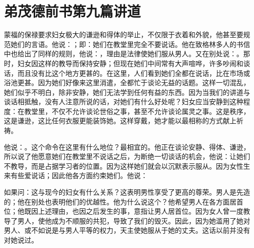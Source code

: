 
\section{弟茂德前书第九篇讲道}

\par

\par

蒙福的保禄要求妇女极大的谦逊和得体的举止，不仅限于衣着和外貌，他甚至要规范她们的言语。他说：；即：她们在教堂里完全不要说话。他在致格林多人的书信中也给出了同样的规则，他说：，理由是法律使她们服从男人。又在别处说：。那时，妇女因这样的教导而保持安静；但现在她们中间常有大声喧哗，许多吵闹和谈话，而且没有比这个地方更甚的。在这里，人们看到她们全都在说话，比在市场或浴池更甚。因为她们好像来这里消遣，全都忙于谈论无益的话题。这样一切混乱，她们似乎不明白，除非安静，她们无法学到任何有益的东西。因为当我们的讲道与谈话相抵触，没有人注意所说的话，对她们有什么好处呢？妇女应当安静到这种程度：在教堂里，不仅不允许谈论世俗之事，甚至不允许谈论属灵之事。这是秩序，这是谦逊，这比任何衣服更能装饰她。这样穿戴，她才能以最相称的方式献上祈祷。\par

他说：。这个命令在这里有什么地位？最相宜的。他正在谈论安静、得体、谦逊，所以说了他愿意她们在教堂里不说话之后，为断绝一切谈话的机会，他说：让她们不教导，而是占据学习者的位置。因为这样她们就会以沉默表示服从。因为女性生来有些爱说话；因此他各方面约束她们。他说：\par

如果问：这与现今的妇女有什么关系？这表明男性享受了更高的尊荣。男人是先造的；他在别处也表明他们的优越性。他为什么说这个？他希望男人在各方面居首位；他既因上述理由，也因之后发生的事，意指让男人居首位。因为女人曾一度教导了男人，使他成为不顺服的共犯，导致了我们的毁灭。因此，因为她滥用了她对男人、或不如说是与男人平等的权力，天主使她服从于她的丈夫。这话以前并没有对她说过。\par

